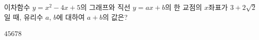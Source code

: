 이차함수 $y=x^2-4x+5$의 그래프와 직선 $y=ax+b$의 한 교점의 $x$좌표가 $3+2\sqrt{2}$일 때, 유리수 $a$, $b$에 대하여 $a+b$의 값은?
\begin{choices32}{$4$}{$5$}{$6$}{$7$}{$8$}\end{choices32}
